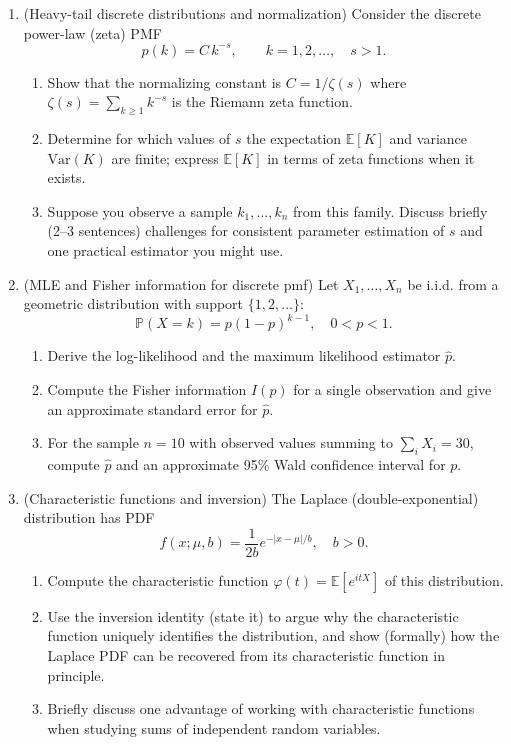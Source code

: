 \documentclass[12pt,a4paper]{article}
\begin{document}
\begin{enumerate}[label=(\arabic*)]
\item (Heavy-tail discrete distributions and normalization) Consider the discrete power-law (zeta) PMF
    \[ p(k) = C\,k^{-s},\qquad k=1,2,\dots, \quad s>1. \]
    \begin{enumerate}[label=(\alph*)]
    \item Show that the normalizing constant is \(C=1/\zeta(s)\) where \(\zeta(s)=\sum_{k\ge1} k^{-s}\) is the Riemann zeta function.
    \item Determine for which values of \(s\) the expectation \(\mathbb{E}[K]\) and variance \(\mathrm{Var}(K)\) are finite; express \(\mathbb{E}[K]\) in terms of zeta functions when it exists.
    \item Suppose you observe a sample \(k_1,\dots,k_n\) from this family. Discuss briefly (2–3 sentences) challenges for consistent parameter estimation of \(s\) and one practical estimator you might use.
    \end{enumerate}

\item (MLE and Fisher information for discrete pmf) Let \(X_1,\dots,X_n\) be i.i.d. from a geometric distribution with support \(\{1,2,\dots\}\):
    \[ \mathbb{P}(X=k)=p(1-p)^{k-1},\quad 0<p<1. \]
    \begin{enumerate}[label=(\alph*)]
    \item Derive the log-likelihood and the maximum likelihood estimator \(\hat p\).
    \item Compute the Fisher information \(I(p)\) for a single observation and give an approximate standard error for \(\hat p\).
    \item For the sample \(n=10\) with observed values summing to \(\sum_i X_i=30\), compute \(\hat p\) and an approximate 95\% Wald confidence interval for \(p\).
    \end{enumerate}

\item (Characteristic functions and inversion) The Laplace (double-exponential) distribution has PDF
    \[ f(x;\mu,b)=\frac{1}{2b}e^{-|x-\mu|/b},\quad b>0. \]
    \begin{enumerate}[label=(\alph*)]
    \item Compute the characteristic function \(\varphi(t)=\mathbb{E}[e^{itX}]\) of this distribution.
    \item Use the inversion identity (state it) to argue why the characteristic function uniquely identifies the distribution, and show (formally) how the Laplace PDF can be recovered from its characteristic function in principle.
    \item Briefly discuss one advantage of working with characteristic functions when studying sums of independent random variables.
    \end{enumerate}
\end{enumerate}
\end{document}
